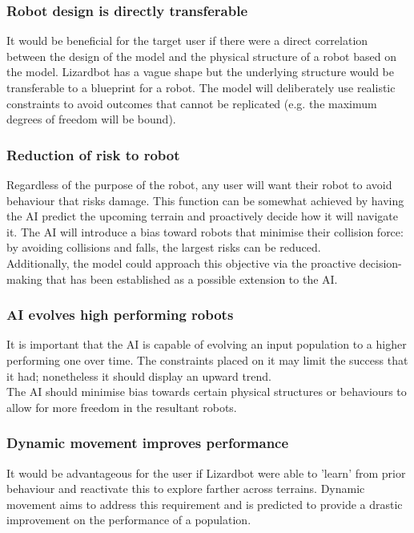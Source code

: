 \documentclass{article}
\begin{document}
\subsubsection{Robot design is directly transferable}
It would be beneficial for the target user if there were a direct correlation between the design of the model and the physical structure of a robot based on the model. Lizardbot has a vague shape but the underlying structure would be transferable to a blueprint for a robot. The model will deliberately use realistic constraints to avoid outcomes that cannot be replicated (e.g. the maximum degrees of freedom will be bound).

\subsubsection{Reduction of risk to robot}
Regardless of the purpose of the robot, any user will want their robot to avoid behaviour that risks damage. This function can be somewhat achieved by having the AI predict the upcoming terrain and proactively decide how it will navigate it. The AI will introduce a bias toward robots that minimise their collision force: by avoiding collisions and falls, the largest risks can be reduced. \\
Additionally, the model could approach this objective via the proactive decision-making that has been established as a possible extension to the AI.

\subsubsection{AI evolves high performing robots}
It is important that the AI is capable of evolving an input population to a higher performing one over time. The constraints placed on it may limit the success that it had; nonetheless it should display an upward trend.\\ The AI should minimise bias towards certain physical structures or behaviours to allow for more freedom in the resultant robots. 

\subsubsection{Dynamic movement improves performance}
It would be advantageous for the user if Lizardbot were able to 'learn' from prior behaviour and reactivate this to explore farther across terrains. Dynamic movement aims to address this requirement and is predicted to provide a drastic improvement on the performance of a population.
\end{document}
